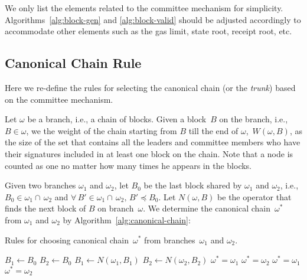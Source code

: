 \documentclass{article}
\begin{document}
We only list the elements related to the committee mechanism for simplicity. Algorithms~\ref{alg:block-gen} and \ref{alg:block-valid} should be adjusted accordingly to accommodate other elements such as the gas limit, state root, receipt root, etc.

\subsection{Canonical Chain Rule}
Here we re-define the rules for selecting the canonical chain (or the \textit{trunk}) based on the committee mechanism.

Let $\omega$ be a branch, i.e., a chain of blocks. Given a block~$B$ on the branch, i.e.,~$B\in\omega$, we the weight of the chain starting from $B$ till the end of $\omega$,~$W(\omega,B)$, as the size of the set that contains all the leaders and committee members who have their signatures included in at least one block on the chain. Note that a node is counted as one no matter how many times he appears in the blocks.

Given two branches $\omega_1$ and $\omega_2$, let $B_0$ be the last block shared by $\omega_1$ and $\omega_2$, i.e., $B_0\in\omega_1\cap\,\omega_2$ and $\forall\, B'\in\omega_1\cap\,\omega_2,\, B'\preceq B_0$. Let $N(\omega,B)$ be the operator that finds the next block of $B$ on branch~$\omega$. We determine the canonical chain~$\omega^*$ from $\omega_1$ and $\omega_2$ by Algorithm~\ref{alg:canonical-chain}:

\begin{algorithm}[H]
\caption{Rules for choosing canonical chain~$\omega^*$ from branches~$\omega_1$ and $\omega_2$.}
\label{alg:canonical-chain}
\begin{spacing}{1.2}
\begin{algorithmic}[1]
    \vspace{1ex}
    \State $B_1\leftarrow B_0$
    \State $B_2\leftarrow B_0$
        \State $B_1\leftarrow N(\omega_1,B_1)$
        \State $B_2\leftarrow N(\omega_2,B_2)$
    \EndWhile
        \State $\omega^*=\omega_1$
        \State $\omega^*=\omega_2$
    \Else
            \State $\omega^*=\omega_1$
        \Else
            \State $\omega^*=\omega_2$
        \EndIf
    \EndIf
\end{algorithmic}
\end{spacing}
\end{algorithm}
\end{document}
